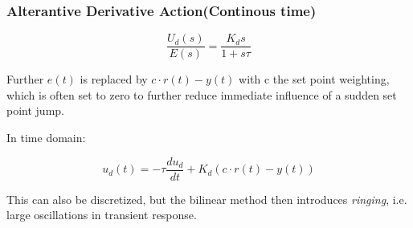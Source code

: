 \begin{frame}
	\frametitle{Alterantive Derivative Action(Continous time)}
	\begin{equation*}
		\frac{U_d(s)}{E(s)} = \frac{K_d s}{1+s\tau}
	\end{equation*}
	
	Further $e(t)$ is replaced by $c\cdot r(t)-y(t)$ with c the set point weighting, which is often set to zero to further reduce immediate influence of a sudden set point jump. 
	
	In time domain:
	
	\begin{equation*}
		u_d(t) = -\tau\frac{du_d}{dt} + K_d(c\cdot r(t)-y(t))
	\end{equation*}
	
	This can also be discretized, but the bilinear method then introduces \emph{ringing}, i.e. large oscillations in transient response.
\end{frame}
